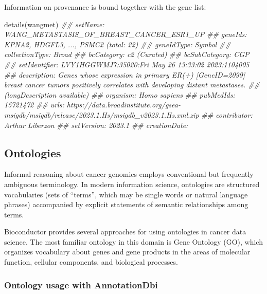 \documentclass[]{article}
\newcommand{\hlcom}[1]{\textcolor[rgb]{0.502,0.502,0.502}{\textit{#1}}}%
\newcommand{\hlstd}[1]{\textcolor[rgb]{0.251,0.251,0.251}{#1}}%
\newcommand{\hlkwd}[1]{\textcolor[rgb]{0.878,0.439,0.125}{#1}}%
\newenvironment{Shaded}{\begin{myshaded}}{\end{myshaded}}
\newcommand{\KeywordTok}[1]{\hlkwd{#1}}
\newcommand{\CommentTok}[1]{\hlcom{#1}}
\newcommand{\NormalTok}[1]{\hlstd{#1}}
\begin{document}
Information on provenance is bound together with the gene list:

\begin{Shaded}
\begin{Highlighting}[]
\KeywordTok{details}\NormalTok{(wangmet)}
\CommentTok{\#\# setName: WANG\_METASTASIS\_OF\_BREAST\_CANCER\_ESR1\_UP }
\CommentTok{\#\# geneIds: KPNA2, HDGFL3, ..., PSMC2 (total: 22)}
\CommentTok{\#\# geneIdType: Symbol}
\CommentTok{\#\# collectionType: Broad}
\CommentTok{\#\#   bcCategory: c2 (Curated)}
\CommentTok{\#\#   bcSubCategory: CGP}
\CommentTok{\#\# setIdentifier: LVY1HGGWMJ7:35020:Fri May 26 13:33:02 2023:1104005}
\CommentTok{\#\# description: Genes whose expression in primary ER(+) [GeneID=2099] breast cancer tumors positively correlates with developing distant metastases.}
\CommentTok{\#\#   (longDescription available)}
\CommentTok{\#\# organism: Homo sapiens}
\CommentTok{\#\# pubMedIds: 15721472}
\CommentTok{\#\# urls: https://data.broadinstitute.org/gsea{-}msigdb/msigdb/release/2023.1.Hs/msigdb\_v2023.1.Hs.xml.zip}
\CommentTok{\#\# contributor: Arthur Liberzon}
\CommentTok{\#\# setVersion: 2023.1}
\CommentTok{\#\# creationDate:}
\end{Highlighting}
\end{Shaded}

\hypertarget{ontologies}{%
\subsection{Ontologies}\label{ontologies}}

Informal reasoning about cancer genomics employs conventional
but frequently ambiguous terminology. In modern
information science, ontologies are structured vocabularies
(sets of ``terms'', which may be single words or natural language
phrases) accompanied by
explicit statements of semantic relationships among terms.

Bioconductor provides several approaches for using ontologies
in cancer data science. The most familiar ontology
in this domain is Gene Ontology (GO), which organizes vocabulary
about genes and gene products in
the areas of molecular function, cellular components, and
biological processes.

\hypertarget{ontology-usage-with-annotationdbi}{%
\subsubsection{Ontology usage with AnnotationDbi}\label{ontology-usage-with-annotationdbi}}
\end{document}
